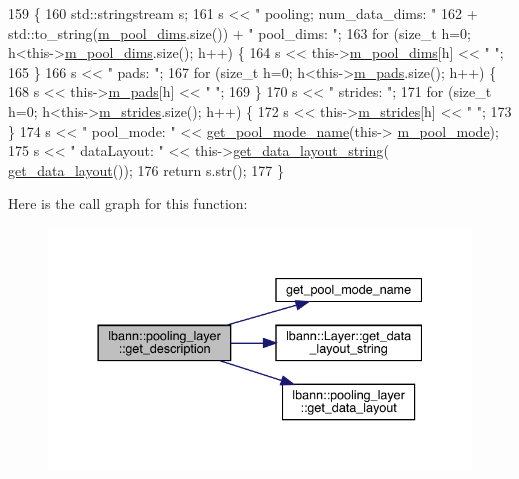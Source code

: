 \begin{DoxyCode}
159                                              \{
160     std::stringstream s;
161     s << \textcolor{stringliteral}{" pooling; num\_data\_dims: "}
162     + std::to\_string(\hyperlink{classlbann_1_1pooling__layer_abb52fe974f602921823a46320fd7d075}{m\_pool\_dims}.size()) + \textcolor{stringliteral}{" pool\_dims: "};
163     \textcolor{keywordflow}{for} (\textcolor{keywordtype}{size\_t} h=0; h<this->\hyperlink{classlbann_1_1pooling__layer_abb52fe974f602921823a46320fd7d075}{m\_pool\_dims}.size(); h++) \{
164       s << this->\hyperlink{classlbann_1_1pooling__layer_abb52fe974f602921823a46320fd7d075}{m\_pool\_dims}[h] << \textcolor{stringliteral}{" "};
165     \}
166     s << \textcolor{stringliteral}{" pads: "};
167     \textcolor{keywordflow}{for} (\textcolor{keywordtype}{size\_t} h=0; h<this->\hyperlink{classlbann_1_1pooling__layer_a22fd39aa4358149110a369ddf0e5ffdb}{m\_pads}.size(); h++) \{
168       s << this->\hyperlink{classlbann_1_1pooling__layer_a22fd39aa4358149110a369ddf0e5ffdb}{m\_pads}[h] << \textcolor{stringliteral}{" "};
169     \}
170     s << \textcolor{stringliteral}{" strides: "};
171     \textcolor{keywordflow}{for} (\textcolor{keywordtype}{size\_t} h=0; h<this->\hyperlink{classlbann_1_1pooling__layer_a754bb6d49b39e915f315ca0049c953d9}{m\_strides}.size(); h++) \{
172       s << this->\hyperlink{classlbann_1_1pooling__layer_a754bb6d49b39e915f315ca0049c953d9}{m\_strides}[h] << \textcolor{stringliteral}{" "};
173     \}
174     s << \textcolor{stringliteral}{" pool\_mode: "} << \hyperlink{base_8cpp_af3cdcb8265717e1115135deb3618e5dd}{get\_pool\_mode\_name}(this->
      \hyperlink{classlbann_1_1pooling__layer_a7b19407c88f89757e64ed3d4afab8443}{m\_pool\_mode});
175     s << \textcolor{stringliteral}{" dataLayout: "} << this->\hyperlink{classlbann_1_1Layer_ae3f4a5602df821f4221614b1e3782dc1}{get\_data\_layout\_string}(
      \hyperlink{classlbann_1_1pooling__layer_ad6d7e7476521ed4a4c43db493807b2ca}{get\_data\_layout}());
176     \textcolor{keywordflow}{return} s.str();
177   \}
\end{DoxyCode}
Here is the call graph for this function\+:\nopagebreak
\begin{figure}[H]
\begin{center}
\leavevmode
\includegraphics[width=337pt]{classlbann_1_1pooling__layer_a11f6d5c7ef16a62d081164f174825ab2_cgraph}
\end{center}
\end{figure}
